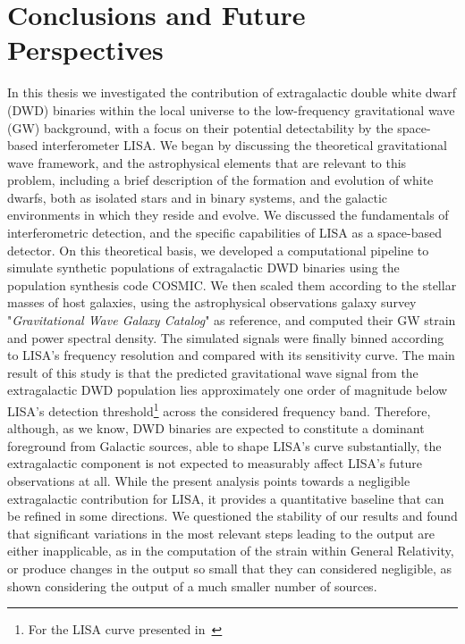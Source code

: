 \chapter*{Conclusions and Future Perspectives}
In this thesis we investigated the contribution of extragalactic double white dwarf (DWD) binaries within the local universe to the low-frequency gravitational wave (GW) background, with a focus on their potential detectability by the space-based interferometer LISA.
We began by discussing the theoretical gravitational wave framework, and the astrophysical elements that are relevant to this problem, including a brief description of the formation and evolution of white dwarfs, both as isolated stars and in binary systems, and the galactic environments in which they reside and evolve.
We discussed the fundamentals of interferometric detection, and the specific capabilities of LISA as a space-based detector.  
On this theoretical basis, we developed a computational pipeline to simulate synthetic populations of extragalactic DWD binaries using the population synthesis code COSMIC.
We then scaled them according to the stellar masses of host galaxies, using the astrophysical observations galaxy survey "\textit{Gravitational Wave Galaxy Catalog}" as reference, and computed their GW strain and power spectral density.
The simulated signals were finally binned according to LISA’s frequency resolution and compared with its sensitivity curve.
The main result of this study is that the predicted gravitational wave signal from the extragalactic DWD population lies approximately one order of magnitude below LISA’s detection threshold\footnote{For the LISA curve presented in~\cite{Robson_2019}} across the considered frequency band.
Therefore, although, as we know, DWD binaries are expected to constitute a dominant foreground from Galactic sources, able to shape LISA's curve substantially, the extragalactic component is not expected to measurably affect LISA's future observations at all.
While the present analysis points towards a negligible extragalactic contribution for LISA, it provides a quantitative baseline that can be refined in some directions.
We questioned the stability of our results and found that significant variations in the most relevant steps leading to the output are either inapplicable, as in the computation of the strain within General Relativity, or produce changes in the output so small that they can considered negligible, as shown considering the output of a much smaller number of sources.
